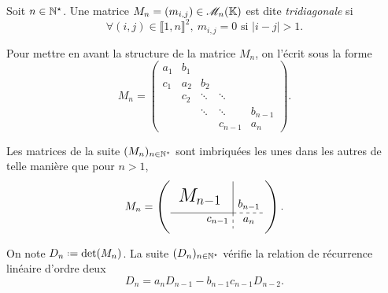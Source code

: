 \begin{defi}
    Soit $n \in \mathbb{N}^\star$. Une matrice $M_n = (m_{i,j}) \in \mathscr{M}_n(\mathbb{K})$ est dite \emph{tridiagonale} si
    $$\forall (i,j) \in \llbracket 1, n \rrbracket^2,\ m_{i,j} = 0 \text{ si } |i-j| > 1.$$
\end{defi}

Pour mettre en avant la structure de la matrice $M_n$, on l'écrit sous la forme
$$
M_n = \begin{pmatrix}
a_1 & b_1 \\
c_1 & a_2 & b_2 \\
& c_2 & \ddots & \ddots \\
& & \ddots & \ddots & b_{n-1} \\
& & & c_{n-1} & a_n
\end{pmatrix}.
$$

\newcommand{\mattrign}{
\left(\begin{gathered}
    \tikzpicture[every node/.style={anchor=south west}]
        \node[minimum width=1.5cm,minimum height=1cm] at (0.125,0.5) {\LARGE $M_{n-1}$};
        \node[minimum width=1.5cm,minimum height=0.5cm] at (0.75,0) {$c_{n-1}$};
        \node[minimum width=1cm,minimum height=0.5cm] at (2,0) {$a_n$};
        \node[minimum width=1cm,minimum height=1cm] at (2,0.25) {$b_{n-1}$};
        \draw (0,0.5) -- (2,0.5);
        \draw (2,0.5) -- (2,1.5);
        \draw[dashed] (2,0.5) -- (3,0.5);
        \draw[dashed] (2,0.5) -- (2,0);
    \endtikzpicture
    \end{gathered}\right)
}

\begin{remarque}
    Les matrices de la suite $(M_n)_{n \in \mathbb{N}^\star}$ sont imbriquées les unes dans les autres de telle manière que pour $n > 1$,
    $$M_n = \mattrign.$$
\end{remarque}


\begin{prop}
    On note $D_n \defeq \det(M_n)$. La suite $(D_n)_{n \in \mathbb{N}^\star}$ vérifie la relation de récurrence linéaire d'ordre deux 
    $$D_n = a_n D_{n-1} - b_{n-1}c_{n-1}D_{n-2}.$$
\end{prop}

\newcommand{\dettrign}{
\left|\begin{gathered}
    \tikzpicture[every node/.style={anchor=south west}]
        \node[minimum width=1.5cm,minimum height=1cm] at (0.125,0.5) {\LARGE $M_{n-1}$};
        \node[minimum width=1.5cm,minimum height=0.5cm] at (0.75,0) {$c_{n-1}$};
        \node[minimum width=1cm,minimum height=0.5cm] at (2,0) {$a_n$};
        \node[minimum width=1cm,minimum height=1cm] at (2,0.25) {$b_{n-1}$};
        \draw (0,0.5) -- (2,0.5);
        \draw (2,0.5) -- (2,1.5);
        \draw[dashed] (2,0.5) -- (3,0.5);
        \draw[dashed] (2,0.5) -- (2,0);
    \endtikzpicture
    \end{gathered}\right|
}

